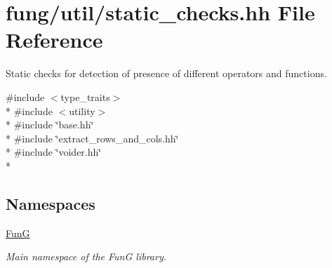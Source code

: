 \hypertarget{static__checks_8hh}{\section{fung/util/static\-\_\-checks.hh File Reference}
\label{static__checks_8hh}
}


Static checks for detection of presence of different operators and functions.  


{\ttfamily \#include $<$type\-\_\-traits$>$}\\*
{\ttfamily \#include $<$utility$>$}\\*
{\ttfamily \#include \char`\"{}base.\-hh\char`\"{}}\\*
{\ttfamily \#include \char`\"{}extract\-\_\-rows\-\_\-and\-\_\-cols.\-hh\char`\"{}}\\*
{\ttfamily \#include \char`\"{}voider.\-hh\char`\"{}}\\*
\subsection*{Namespaces}
\begin{DoxyCompactItemize}
\item 
\hyperlink{namespaceFunG}{Fun\-G}
\begin{DoxyCompactList}\small\item\em Main namespace of the Fun\-G library. \end{DoxyCompactList}\end{DoxyCompactItemize}
